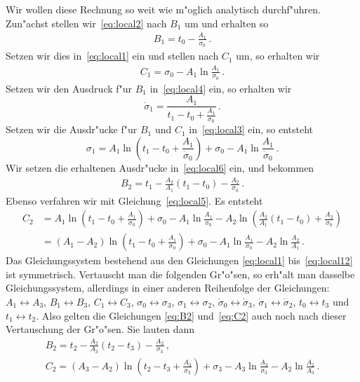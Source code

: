 \documentclass[a4paper]{scrartcl}
\begin{document}
Wir wollen diese Rechnung so weit wie m"oglich analytisch durchf"uhren. 
Zun"achst stellen wir~\eqref{eq:local2} nach $B_1$ um und erhalten so 
\begin{align} \label{eq:B1}
  B_1=t_0-\frac{A_1}{\dot\sigma_0}\,.
\end{align}
Setzen wir dies in~\eqref{eq:local1} ein und stellen nach $C_1$ um, so erhalten wir
\begin{align} \label{eq:C1}
  C_1=\sigma_0-A_1\ln\frac{A_1}{\dot\sigma_0}\,.
\end{align}
Setzen wir den Ausdruck f"ur $B_1$ in~\eqref{eq:local4} ein, so erhalten wir 
$$ \dot\sigma_1 = \frac{A_1}{t_1-t_0+\frac{A_1}{\dot\sigma_0}}\,. $$
Setzen wir die Ausdr"ucke f"ur $B_1$ und $C_1$ in~\eqref{eq:local3} ein, so entsteht
$$ \sigma_1 = A_1\ln\left(t_1-t_0+\frac{A_1}{\dot\sigma_0}\right)+\sigma_0-A_1\ln\frac{A_1}{\dot\sigma_0}\,. $$
Wir setzen die erhaltenen Ausdr"ucke in~\eqref{eq:local6} ein, und bekommen
\begin{align} \label{eq:B2}
  B_2 = t_1-\frac{A_2}{A_1}(t_1-t_0)-\frac{A_2}{\dot\sigma_0}\,.
\end{align}
Ebenso verfahren wir mit Gleichung~\eqref{eq:local5}. Es entsteht
\begin{equation} \label{eq:C2}
\begin{split}
  C_2 
  &= A_1\ln\left(t_1-t_0+\frac{A_1}{\dot\sigma_0}\right)+\sigma_0-A_1\ln\frac{A_1}{\dot\sigma_0}-A_2\ln\left(\frac{A_2}{A_1}(t_1-t_0)+\frac{A_2}{\dot\sigma_0}\right) \\
  &= (A_1-A_2)\ln\left(t_1-t_0+\frac{A_1}{\dot\sigma_0}\right)+\sigma_0-A_1\ln\frac{A_1}{\dot\sigma_0}-A_2\ln\frac{A_2}{A_1}\,.
\end{split}
\end{equation}
Das Gleichungssystem bestehend aus den Gleichungen \eqref{eq:local1} bis~\eqref{eq:local12} ist symmetrisch. 
Vertauscht man die folgenden Gr"o"sen, so erh"alt man dasselbe Gleichungssystem, allerdings in einer anderen Reihenfolge der Gleichungen: $A_1\leftrightarrow A_3$, $B_1\leftrightarrow B_3$, $C_1\leftrightarrow C_3$, $\sigma_0\leftrightarrow \sigma_3$, $\sigma_1\leftrightarrow \sigma_2$, $\dot\sigma_0\leftrightarrow \dot\sigma_3$, $\dot\sigma_1\leftrightarrow \dot\sigma_2$, $t_0\leftrightarrow t_3$ und $t_1\leftrightarrow t_2$. 
Also gelten die Gleichungen \eqref{eq:B2} und~\eqref{eq:C2} auch noch nach dieser Vertauschung der Gr"o"sen. 
Sie lauten dann 
\begin{gather}
  \label{eq:B2symm}
  B_2 = t_2-\frac{A_2}{A_3}(t_2-t_3)-\frac{A_2}{\dot\sigma_3}\,, \\
  \label{eq:C2symm}
  C_2 = (A_3-A_2)\ln\left(t_2-t_3+\frac{A_3}{\dot\sigma_3}\right)+\sigma_3-A_3\ln\frac{A_3}{\dot\sigma_3}-A_2\ln\frac{A_2}{A_3}\,.
\end{gather}
\end{document}
